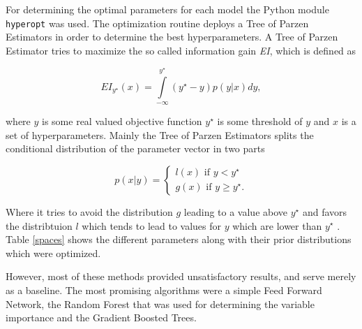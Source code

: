 For determining the optimal parameters for each model the Python module \texttt{hyperopt} was used. The optimization routine deploys a Tree of Parzen Estimators in order to determine the best hyperparameters. A Tree of Parzen Estimator tries to maximize the so called information gain \textit{EI}, which is defined as

\begin{equation*}
EI_{y^\star}(x) = \int\limits_{-\infty}^{y^\star} (y^\star-y)p(y|x)dy,
\end{equation*}

where $y$ is some real valued objective function $y^\star$ is some threshold of $y$ and $x$ is a set of hyperparameters. Mainly the Tree of Parzen Estimators splits the conditional distribution of the parameter vector in two parts

\begin{equation*}
p(x|y) = \begin{cases}
    l(x) \text{ if } y<y^\star \\
    g(x) \text{ if } y \geq y^\star.
    \end{cases}
\end{equation*}

Where it tries to avoid the distribution $g$ leading to a value above $y^\star$ and favors the distribtuion $l$ which tends to lead to values for $y$ which are lower than $y^\star$ \cite{tpe}. Table \ref{spaces} shows the different parameters along with their prior distributions which were optimized.

However, most of these methods provided unsatisfactory results, and serve merely as a baseline. The most promising algorithms were a simple Feed Forward Network, the Random Forest that was used for determining the variable importance and the Gradient Boosted Trees.